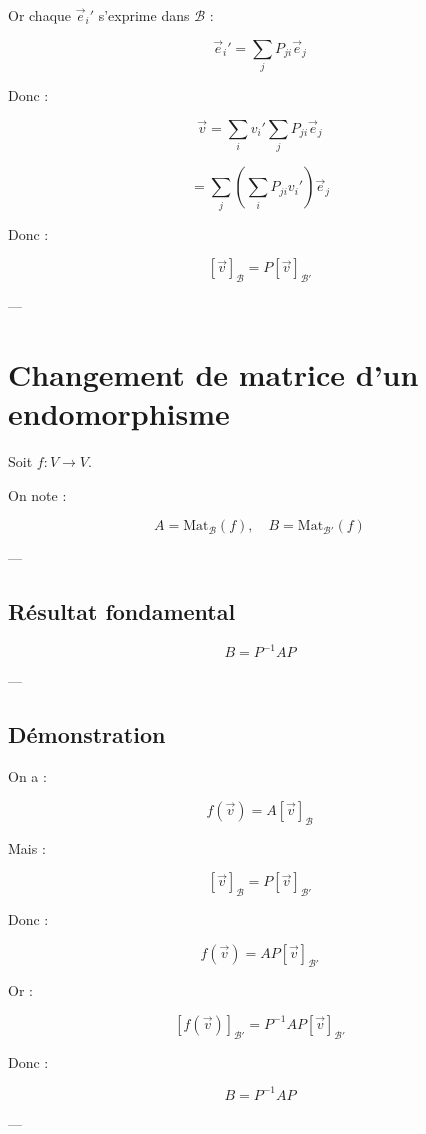 \documentclass[11pt,a4paper]{article}
\begin{document}
Or chaque $\vec{e}_i'$ s’exprime dans $\mathcal{B}$ :

\[
\vec{e}_i' = \sum_j P_{ji} \vec{e}_j
\]

Donc :

\[
\vec{v} = \sum_i v_i' \sum_j P_{ji} \vec{e}_j
\]

\[
= \sum_j \left( \sum_i P_{ji} v_i' \right)\vec{e}_j
\]

Donc :

\[
[\vec{v}]_{\mathcal{B}} = P [\vec{v}]_{\mathcal{B}'}
\]

---

\section{Changement de matrice d’un endomorphisme}

Soit $f : V \to V$.

On note :

\[
A = \text{Mat}_{\mathcal{B}}(f), \quad
B = \text{Mat}_{\mathcal{B}'}(f)
\]

---

\subsection{Résultat fondamental}

\[
\boxed{
B = P^{-1} A P
}
\]

---

\subsection{Démonstration}

On a :

\[
f(\vec{v}) = A [\vec{v}]_{\mathcal{B}}
\]

Mais :

\[
[\vec{v}]_{\mathcal{B}} = P [\vec{v}]_{\mathcal{B}'}
\]

Donc :

\[
f(\vec{v}) = A P [\vec{v}]_{\mathcal{B}'}
\]

Or :

\[
[f(\vec{v})]_{\mathcal{B}'} = P^{-1} A P [\vec{v}]_{\mathcal{B}'}
\]

Donc :

\[
B = P^{-1} A P
\]

---

\end{document}
